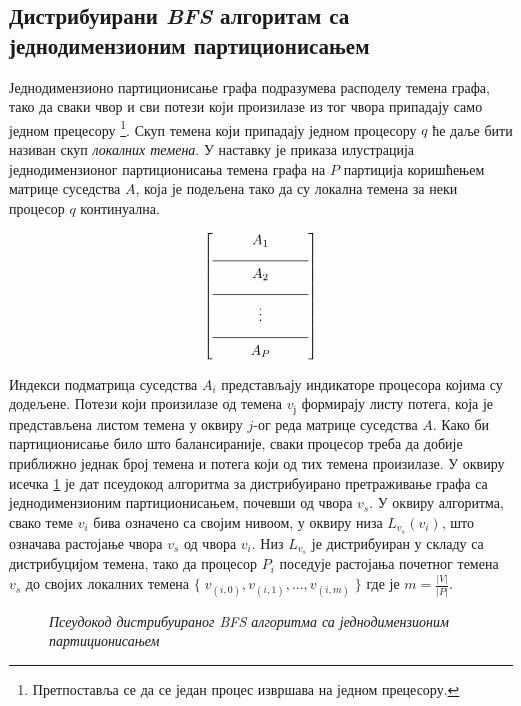 \subsection{Дистрибуирани \textit{BFS} алгоритам са једнодимензионим партиционисањем}
Једнодимензионо партиционисање графа подразумева расподелу темена графа, тако да сваки чвор и сви потези који произилазе из тог чвора припадају само једном прецесору \footnote{Претпоставља се да се један процес извршава на једном прецесору.\label{1p-1P}}. Скуп темена који припадају једном процесору $q$ ће даље бити називан скуп \textit{локалних темена}. У наставку је приказа илустрација једнодимензионог партиционисања темена графа на $P$ партиција коришћењем матрице суседства $A$, која је подељена тако да су локална темена за неки процесор $q$ континуална.

\[
\begin{bmatrix}
A_1 \\
\noindent\rule{0.2\linewidth}{0.5pt} \\
A_2 \\
\noindent\rule{0.2\linewidth}{0.5pt} \\
\vdots \\
\noindent\rule{0.2\linewidth}{0.5pt} \\
A_P \\
\end{bmatrix}
\]

\par
Индекси подматрица суседства $A_i$ представљају индикаторе процесора којима су додељене. Потези који произилазе од темена $v_ј$ формирају листу потега, која је представљена листом темена у оквиру $j$-ог реда матрице суседства $A$. Како би партиционисање било што балансираније, сваки процесор треба да добије приближно једнак број темена и потега који од тих темена произилазе. У оквиру исечка \ref{pseudocode:algorithm-bfs-distance-1D-par-pseudo} је дат псеудокод алгоритма за дистрибуирано претраживање графа са једнодимензионим партиционисањем, почевши од чвора $v_s$. У оквиру алгоритма, свако теме $v_i$ бива означено са својим нивоом, у оквиру низа $L_{v_s}(v_i)$, што означава растојање чвора $v_s$ од чвора $v_i$. Низ $L_{v_s}$ је дистрибуиран у складу са дистрибуцијом темена, тако да процесор $P_i$ поседује растојања почетног темена $v_s$ до својих локалних темена $\{ \; v_{(i, 0)}, v_{(i, 1)}, ..., v_{(i, m)} \; \}$ где је $m = \frac{|V|}{|P|}$.

\begin{figure}[!ht]
    \centering
    
    \caption{\textit{Псеудокод дистрибуираног BFS алгоритма са једнодимензионим партиционисањем}}
    \label{pseudocode:algorithm-bfs-distance-1D-par-pseudo}
\end{figure}


